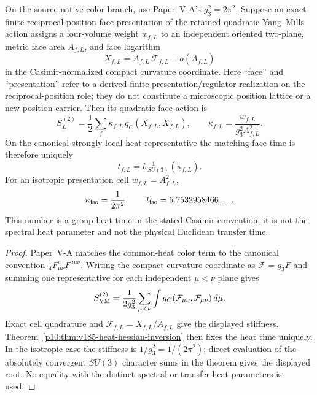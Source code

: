 \documentclass[12pt,a4paper]{article}
\begin{document}
\begin{corollary}
\label{p10:cor:v185-common-heat-face-stiffness}
On the source-native color branch, use Paper~V-A's
$g_3^2=2\pi^2$.  Suppose an exact finite reciprocal-position face presentation of the retained
quadratic Yang--Mills action assigns a four-volume
weight $w_{f,L}$ to an independent oriented two-plane, metric face area
$A_{f,L}$, and face logarithm
\[
 X_{f,L}=A_{f,L}\,\mathcal F_{f,L}+o(A_{f,L})
\]
in the Casimir-normalized compact curvature coordinate.  Here ``face'' and
``presentation'' refer to a derived finite presentation/regulator realization
on the reciprocal-position role; they do not constitute a microscopic position
lattice or a new position carrier.  Then its quadratic face action is
\[
 S_{L}^{(2)}
 =\frac12\sum_f\kappa_{f,L}\,q_C(X_{f,L},X_{f,L}),
 \qquad
 \boxed{
 \kappa_{f,L}=\frac{w_{f,L}}{g_3^2A_{f,L}^2}.}
\]
On the canonical strongly-local heat representative the matching face time is
therefore uniquely
\[
 \boxed{t_{f,L}=h_{SU(3)}^{-1}(\kappa_{f,L}).}
\]
For an isotropic presentation cell $w_{f,L}=A_{f,L}^2$,
\[
 \kappa_{\rm iso}=\frac1{2\pi^2},
 \qquad
 t_{\rm iso}=5.7532958466\ldots .
\]
This number is a group-heat time in the stated Casimir convention; it is not
the spectral heat parameter and not the physical Euclidean transfer time.
\end{corollary}
\begin{proof}
Paper~V-A matches the common-heat color term to the canonical convention
$\frac14F^a_{\mu\nu}F^{a\mu\nu}$.  Writing the compact curvature coordinate
as $\mathcal F=g_3F$ and summing one representative for each independent
$\mu<\nu$ plane gives
\[
 S_{\rm YM}^{(2)}
 =\frac1{2g_3^2}\sum_{\mu<\nu}\int
 q_C(\mathcal F_{\mu\nu},\mathcal F_{\mu\nu})\,d\mu.
\]
Exact cell quadrature and
$\mathcal F_{f,L}=X_{f,L}/A_{f,L}$ give the displayed stiffness.  Theorem~\ref{p10:thm:v185-heat-hessian-inversion}
then fixes the heat time uniquely.  In the isotropic case the stiffness is
$1/g_3^2=1/(2\pi^2)$; direct evaluation of the absolutely convergent
$SU(3)$ character sums in the theorem gives the displayed root.  No equality
with the distinct spectral or transfer heat parameters is used.
\end{proof}
\end{document}
